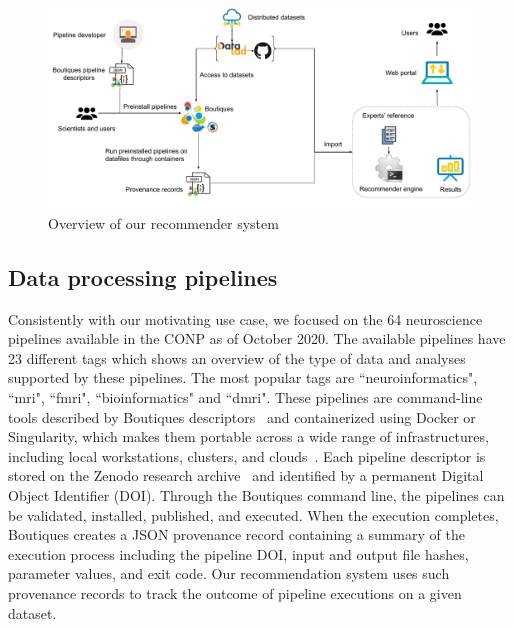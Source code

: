 \documentclass[conference]{IEEEtran}
\begin{document}
\begin{figure}[ht]
  \centering
  \includegraphics[width=\textwidth]{figures/Methodology.pdf}%
  \caption{Overview of our recommender system}
  \label{fig:method}
  \end{figure}  


\subsection{Data processing pipelines} 
Consistently with our motivating use case, we focused on the 64
neuroscience pipelines available in the CONP as of October
2020. 
The available pipelines have 23 different tags which shows an overview of the type of data
and analyses supported by these pipelines. The most popular tags are ``neuroinformatics", ``mri", ``fmri", ``bioinformatics" and ``dmri". These pipelines are command-line
tools described by Boutiques descriptors~\cite{glatard2018boutiques} and
containerized using Docker or Singularity, which makes them portable across
a wide range of infrastructures, including local workstations, clusters,
and clouds~\cite{kiar2019serverless}. Each pipeline descriptor is stored on
the Zenodo research archive~\cite{https://doi.org/10.25495/7gxk-rd71} and identified by a permanent Digital Object
Identifier (DOI). Through the Boutiques command line, the pipelines can be
validated, installed, published, and executed. When the execution
completes, Boutiques creates a JSON provenance record containing a summary
of the execution process including the pipeline DOI, input and output file
hashes, parameter values, and exit code. Our recommendation system uses
such provenance records to track the outcome of pipeline executions on a
given dataset.
\end{document}
